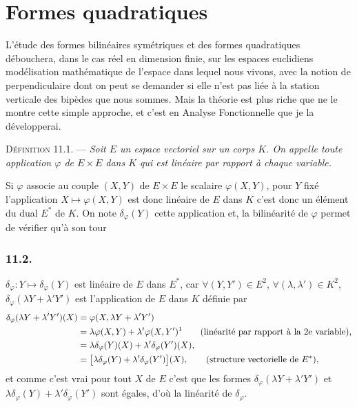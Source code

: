 \chapter{Formes quadratiques}

L'étude des formes bilinéaires symétriques et des formes quadratiques débouchera, dans le cas réel en dimension finie, sur les espaces euclidiens modélisation mathématique de l'espace dans lequel nous vivons, avec la notion de perpendiculaire dont on peut se demander si elle n'est pas liée à la station verticale des bipèdes que nous sommes. Mais la théorie est plus riche que ne le montre cette simple approche, et c'est en Analyse Fonctionnelle que je la développerai.


\medskip\noindent\textsc{Définition 11.1.} --- \emph{Soit $E$ un espace vectoriel sur un corps $K$. On appelle  toute application $\varphi$ de $E\times E$ dans $K$ qui est linéaire par rapport à chaque variable.}

Si $\varphi$ associe au couple $(X,Y)$ de $E\times E$ le scalaire $\varphi(X,Y)$, pour $Y$ fixé l'application $X\longmapsto\varphi(X,Y)$ est donc linéaire de $E$ dans $K$ c'est donc un élément du dual $E^*$ de $K$. On note $\delta_\varphi(Y)$ cette application et, la bilinéarité de $\varphi$ permet de vérifier qu'à son tour

\subsection*{11.2.}
$\delta_\varphi:Y\longmapsto\delta_\varphi(Y)$ est linéaire de $E$ dans $E^*$, car $\forall(Y,Y')\in E^2$, $\forall(\lambda,\lambda')\in K^2$, $\delta_\varphi(\lambda Y+\lambda'Y')$ est l'application de $E$ dans $K$ définie par
\begin{align*}
\delta_\varphi(\lambda Y+\lambda'Y')(X)
 &=\varphi(X,\lambda Y+\lambda'Y')\\
 &=\lambda\varphi(X,Y)+\lambda'\varphi(X,Y')\text{\footnotemark}
 \qquad\text{(linéarité par rapport à la 2e variable),}\\
 &=\lambda\delta_\varphi(Y)(X)+\lambda'\delta_\varphi(Y')(X),\\
 &=\bigl[\lambda\delta_\varphi(Y)+\lambda'\delta_\varphi(Y')\bigr](X),
 \qquad\text{(structure vectorielle de $E^*$),}
\end{align*}
et comme c'est vrai pour tout $X$ de $E$ c'est que les formes $\delta_\varphi(\lambda Y+\lambda'Y')$ et $\lambda\delta_\varphi(Y)+\lambda'\delta_\varphi(Y')$ sont égales, d'où la linéarité de $\delta_\varphi$. \bookend

